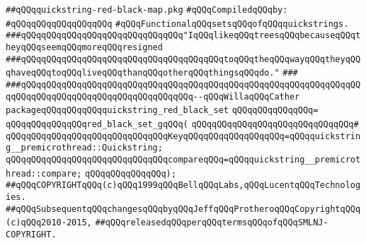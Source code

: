 \label{src/lib/src/quickstring-red-black-set.pkg}
\verb|##qQQqquickstring-red-black-map.pkg|\newline
\newline
\verb|#qQQqCompiledqQQqby:|\newline
\verb|#qQQqqQQqqQQqqQQqqQQq|\newline
\newline
\verb|#qQQqFunctionalqQQqsetsqQQqofqQQqquickstrings.|\newline
\newline
\verb|###qQQqqQQqqQQqqQQqqQQqqQQqqQQqqQQq"IqQQqlikeqQQqtreesqQQqbecauseqQQqtheyqQQqseemqQQqmoreqQQqresigned|\newline
\verb|###qQQqqQQqqQQqqQQqqQQqqQQqqQQqqQQqqQQqqQQqtoqQQqtheqQQqwayqQQqtheyqQQqhaveqQQqtoqQQqliveqQQqthanqQQqotherqQQqthingsqQQqdo."|\newline
\verb|###|\newline
\verb|###qQQqqQQqqQQqqQQqqQQqqQQqqQQqqQQqqQQqqQQqqQQqqQQqqQQqqQQqqQQqqQQqqQQqqQQqqQQqqQQqqQQqqQQqqQQqqQQqqQQqqQQq--qQQqWillaqQQqCather|\newline
\newline
\newline
\verb|packageqQQqqQQqqQQqquickstring_red_black_set|\newline
\verb|qQQqqQQqqQQqqQQq=|\newline
\verb|qQQqqQQqqQQqqQQqred_black_set_gqQQq(|\newline
\verb|qQQqqQQqqQQqqQQqqQQqqQQqqQQqqQQq#|\newline
\verb|qQQqqQQqqQQqqQQqqQQqqQQqqQQqqQQqKeyqQQqqQQqqQQqqQQqqQQq=qQQqquickstring__premicrothread::Quickstring;|\newline
\verb|qQQqqQQqqQQqqQQqqQQqqQQqqQQqqQQqcompareqQQq=qQQqquickstring__premicrothread::compare;|\newline
\verb|qQQqqQQqqQQqqQQq);|\newline
\newline
\newline
\verb|##qQQqCOPYRIGHTqQQq(c)qQQq1999qQQqBellqQQqLabs,qQQqLucentqQQqTechnologies.|\newline
\verb|##qQQqSubsequentqQQqchangesqQQqbyqQQqJeffqQQqProtheroqQQqCopyrightqQQq(c)qQQq2010-2015,|\newline
\verb|##qQQqreleasedqQQqperqQQqtermsqQQqofqQQqSMLNJ-COPYRIGHT.|\newline

